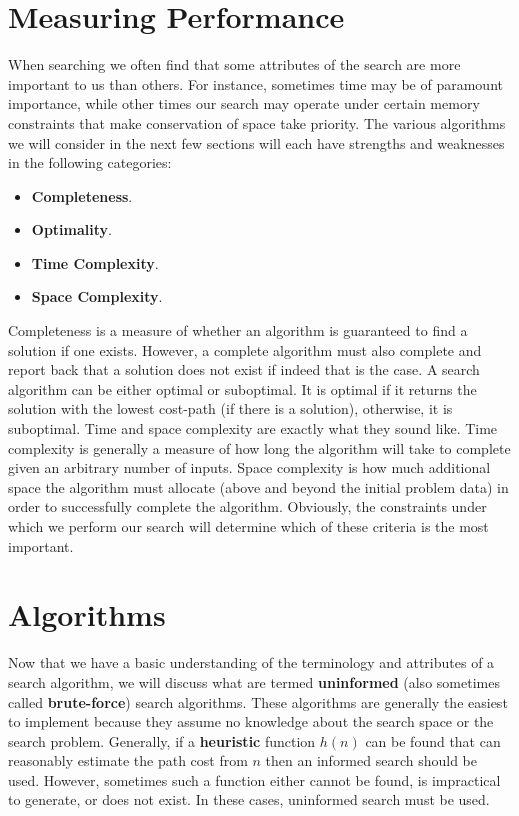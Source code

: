 \documentclass[a4paper,11pt]{report}
\begin{document}
\section{Measuring Performance}
When searching we often find that some attributes of the search are more
important to us than others.  For instance, sometimes time may be of
paramount importance, while other times our search may operate under certain
memory constraints that make conservation of space take priority.  The various
algorithms we will consider in the next few sections will each have strengths
and weaknesses in the following categories:

\begin{itemize}
\item \textbf{Completeness}.
\item \textbf{Optimality}.
\item \textbf{Time Complexity}.
\item \textbf{Space Complexity}.
\end{itemize}

Completeness is a measure of whether an algorithm is guaranteed to find a
solution if one exists.  However, a complete algorithm must also complete and
report back that a solution does not exist if indeed that is the case.
\cite{lavalle06} A search algorithm can be either optimal or suboptimal.  It
is optimal if it returns the solution with the lowest cost-path (if there is a 
solution), otherwise, it is suboptimal.\cite{norvig} Time and space complexity
are exactly what they sound like.  Time complexity is generally a measure of 
how long the algorithm will take to complete given an arbitrary number of
inputs.  Space complexity is how much additional space the algorithm must
allocate (above and beyond the initial problem data) in order to successfully
complete the algorithm.  Obviously, the constraints under which we perform our
search will determine which of these criteria is the most important.

\section{Algorithms}
Now that we have a basic understanding of the terminology and attributes of a
search algorithm, we will discuss what are termed \textbf{uninformed} (also 
sometimes called \textbf{brute-force}) search algorithms.  These algorithms
are generally the easiest to implement because they assume no knowledge about
the search space or the search problem.  Generally, if a \textbf{heuristic}
function $h(n)$ can be found that can reasonably estimate the path cost
from $n$ then an informed search should be used.  However, sometimes such
a function either cannot be found, is impractical to generate, or does not 
exist.  In these cases, uninformed search must be used.\cite{norvig}
\end{document}
